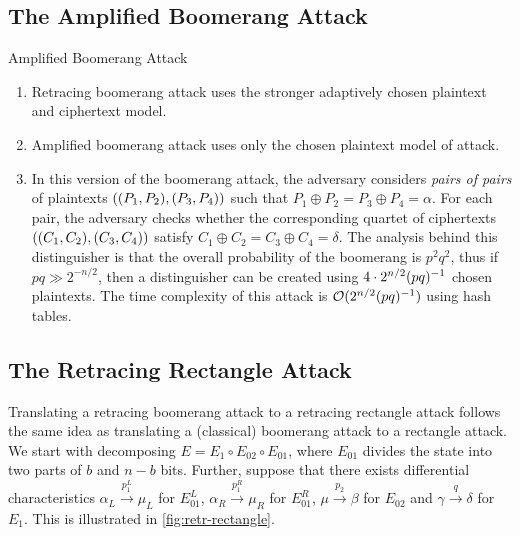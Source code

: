 \documentclass[notheorems]{beamer}
\theoremstyle{definition}
\theoremstyle{example}
\begin{document}
    \subsection{The Amplified Boomerang Attack}
    \label{subsec:amplified-boomerang}

    \begin{frame}[<+->]{Amplified Boomerang Attack}
        \begin{enumerate}
            \item Retracing boomerang attack uses the stronger adaptively
            chosen plaintext and ciphertext model.
            \item Amplified boomerang attack uses only the chosen plaintext
            model of attack.
            \item In this version of the boomerang attack, the adversary 
            considers \emph{pairs of pairs} of plaintexts 
            \(((P_1, P_2), (P_3, P_4))\) such that \(P_1 \oplus
            P_2 = P_3 \oplus P_4 = \alpha\). For each pair, the adversary
            checks whether the corresponding quartet of ciphertexts
            \(((C_1, C_2), (C_3, C_4))\) satisfy \(C_1 \oplus
            C_2 = C_3 \oplus C_4 = \delta\).
            The analysis behind this distinguisher is that the overall probability of the
            boomerang is \(p^2q^2\), thus if \(pq \gg 2^{-n/2}\), then a distinguisher can
            be created using \(4 \cdot 2^{n/2}(pq)^{-1}\) chosen plaintexts. The time
            complexity of this attack is \(\mathcal O(2^{n/2}(pq)^{-1})\) using hash
            tables.

        \end{enumerate}
    \end{frame}
\subsection{The Retracing Rectangle Attack}

Translating a retracing boomerang attack to a retracing rectangle attack follows
the same idea as translating a (classical) boomerang attack to a rectangle
attack. We start with decomposing \(E = E_1 \circ E_{02} \circ E_{01}\), where
\(E_{01}\) divides the state into two parts of \(b\) and \(n - b\) bits.
Further, suppose that there exists differential characteristics \(\alpha_L
\xrightarrow{p_1^L} \mu_L\) for \(E_{01}^L\), \(\alpha_R \xrightarrow{p_1^R}
\mu_R\) for \(E_{01}^R\), \(\mu \xrightarrow{p_2} \beta\) for \(E_{02}\) and
\(\gamma \xrightarrow{q} \delta\) for \(E_1\). This is illustrated in
\autoref{fig:retr-rectangle}.
\end{document}

